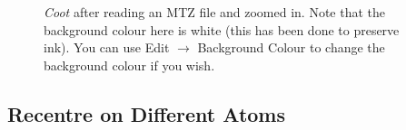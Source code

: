 \documentclass{article}
\begin{document}
\begin{figure}[htbp]
  \begin{center}
    \leavevmode
    \epsfxsize 70mm
    \caption{\emph{Coot} after reading an MTZ file and zoomed in. Note that the
      background colour here is white (this has been done to preserve ink). You can
      use Edit $\rightarrow$ Background Colour to change the background colour if you wish.}
    \label{fig:map_screenshot}
  \end{center}
\end{figure}

\subsection {Recentre on Different Atoms}
\end{document}
